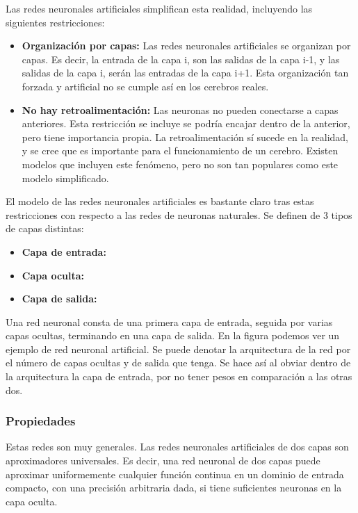 Las redes neuronales artificiales simplifican esta realidad, incluyendo las siguientes restricciones:
\begin{itemize}
\item \textbf{Organización por capas:} Las redes neuronales artificiales se organizan por capas. Es decir, la entrada de la capa i, son las salidas de la capa i-1, y las salidas de la capa i, serán las entradas de la capa i+1. Esta organización tan forzada y artificial no se cumple así en los cerebros reales. 
\item \textbf{No hay retroalimentación:} Las neuronas no pueden conectarse a capas anteriores. Esta restricción se incluye se podría encajar dentro de la anterior, pero tiene importancia propia. La retroalimentación sí sucede en la realidad, y se cree que es importante para el funcionamiento de un cerebro. Existen modelos que incluyen este fenómeno, pero no son tan populares como este modelo simplificado. 
\end{itemize}

El modelo de las redes neuronales artificiales es bastante claro tras estas restricciones con respecto a las redes de neuronas naturales. Se definen de 3 tipos de capas distintas:
\begin{itemize}
\item \textbf{Capa de entrada:} 
\item \textbf{Capa oculta:}
\item \textbf{Capa de salida:}
\end{itemize}

Una red neuronal consta de una primera capa de entrada, seguida por varias capas ocultas, terminando en una capa de salida. En la figura  podemos ver un ejemplo de red neuronal artificial. Se puede denotar la arquitectura de la red por el número de capas ocultas y de salida que tenga. Se hace así al obviar dentro de la arquitectura la capa de entrada, por no tener pesos en comparación a las otras dos.\\

\subsubsection{Propiedades}

Estas redes son muy generales. Las redes neuronales artificiales de dos capas son aproximadores universales. Es decir, una red neuronal de dos capas puede aproximar uniformemente cualquier función continua en un dominio de entrada compacto, con una precisión arbitraria dada, si tiene suficientes neuronas en la capa oculta. \\


